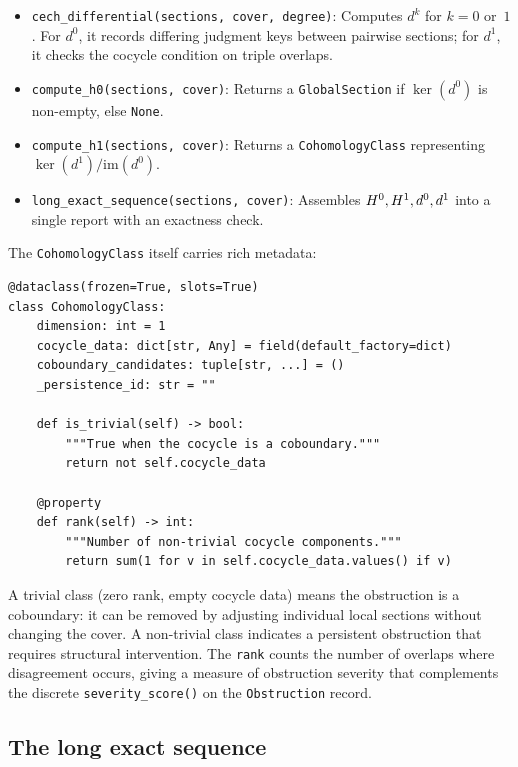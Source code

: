 \documentclass[11pt]{article}
\begin{document}
\begin{itemize}[leftmargin=*]
\item \texttt{cech\_differential(sections, cover, degree)}: Computes $d^k$
  for $k = 0$ or~$1$.  For $d^0$, it records differing judgment keys between
  pairwise sections; for $d^1$, it checks the cocycle condition on triple
  overlaps.
\item \texttt{compute\_h0(sections, cover)}: Returns a
  \texttt{GlobalSection} if $\ker(d^0)$ is non-empty, else \texttt{None}.
\item \texttt{compute\_h1(sections, cover)}: Returns a
  \texttt{CohomologyClass} representing $\ker(d^1)/\mathrm{im}(d^0)$.
\item \texttt{long\_exact\_sequence(sections, cover)}: Assembles
  $H^{0}, H^{1}, d^0, d^1$ into a single report with an exactness
  check.
\end{itemize}

The \texttt{CohomologyClass} itself carries rich metadata:

\begin{lstlisting}[caption={Cohomology class (simplified).},label={lst:cohomology-class}]
@dataclass(frozen=True, slots=True)
class CohomologyClass:
    dimension: int = 1
    cocycle_data: dict[str, Any] = field(default_factory=dict)
    coboundary_candidates: tuple[str, ...] = ()
    _persistence_id: str = ""

    def is_trivial(self) -> bool:
        """True when the cocycle is a coboundary."""
        return not self.cocycle_data

    @property
    def rank(self) -> int:
        """Number of non-trivial cocycle components."""
        return sum(1 for v in self.cocycle_data.values() if v)
\end{lstlisting}

\noindent
A trivial class (zero rank, empty cocycle data) means the obstruction is a
coboundary: it can be removed by adjusting individual local sections without
changing the cover.  A non-trivial class indicates a persistent obstruction
that requires structural intervention.  The \texttt{rank} counts the number
of overlaps where disagreement occurs, giving a measure of obstruction
severity that complements the discrete \texttt{severity\_score()} on the
\texttt{Obstruction} record.

\subsection{The long exact sequence}
\end{document}
